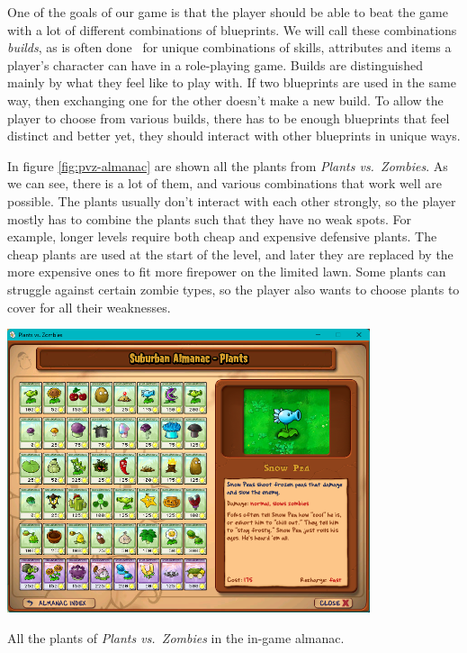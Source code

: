 One of the goals of our game is that the player should be able to beat the game with a lot of different combinations of blueprints.
We will call these combinations \emph{builds}, as is often done~\cite{buildDict} for unique combinations of skills, attributes and items a player's character can have in a role-playing game.
Builds are distinguished mainly by what they feel like to play with.
If two blueprints are used in the same way, then exchanging one for the other doesn't make a new build.
To allow the player to choose from various builds, there has to be enough blueprints that feel distinct and better yet, they should interact with other blueprints in unique ways.

In figure \ref{fig:pvz-almanac} are shown all the plants from \emph{Plants vs.\ Zombies}.
As we can see, there is a lot of them, and various combinations that work well are possible.
The plants usually don't interact with each other strongly, so the player mostly has to combine the plants such that they have no weak spots.
For example, longer levels require both cheap and expensive defensive plants.
The cheap plants are used at the start of the level, and later they are replaced by the more expensive ones to fit more firepower on the limited lawn.
Some plants can struggle against certain zombie types, so the player also wants to choose plants to cover for all their weaknesses.

\begin{center}
    \captionsetup{type=figure}
    \includegraphics[width=0.8\textwidth]{img/Plants-vs-Zombies-Almanac.png}
    \caption{All the plants of \emph{Plants vs.\ Zombies} in the in-game almanac.}
    \label{fig:pvz-almanac}
\end{center}

